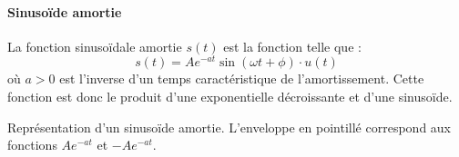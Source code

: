 \paragraph{Sinuso\"ide amortie}
La fonction sinuso\"idale amortie $s(t)$ est la fonction telle que :
\[
    s(t)=Ae^{-at}\sin{(\omega t +\phi)}\cdot u(t)
\]
où $a>0$ est l'inverse d'un temps caractéristique de l'amortissement.
Cette fonction est donc le produit d'une exponentielle décroissante et 
d'une sinuso\"ide.
\begin{marginfigure}[-8em]
    \centering
    \resizebox{\linewidth}{!}{}
    \caption{Représentation d'un sinuso\"ide amortie. L'enveloppe en pointillé 
             correspond aux fonctions $Ae^{-at}$ et $-Ae^{-at}$.
             \label{fig-sin_amor}}
\end{marginfigure}
\newpage
\restoregeometry
\captionsetup{width=0.9\linewidth}
